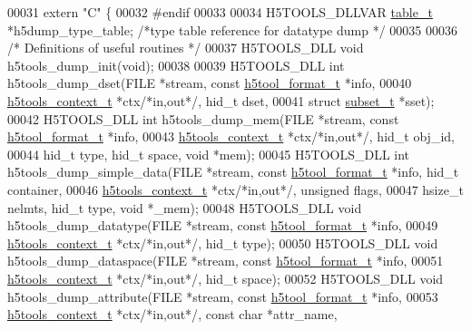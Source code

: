 \begin{DoxyCode}
00031 \textcolor{keyword}{extern} \textcolor{stringliteral}{"C"} \{
00032 \textcolor{preprocessor}{#endif}
00033 
00034 H5TOOLS\_DLLVAR \hyperlink{structtable__t}{table\_t} *h5dump\_type\_table;  \textcolor{comment}{/*type table reference for datatype dump  */}
00035 
00036 \textcolor{comment}{/* Definitions of useful routines */}
00037 H5TOOLS\_DLL \textcolor{keywordtype}{void}    h5tools\_dump\_init(\textcolor{keywordtype}{void});
00038 
00039 H5TOOLS\_DLL \textcolor{keywordtype}{int}     h5tools\_dump\_dset(FILE *stream, \textcolor{keyword}{const} \hyperlink{structh5tool__format__t}{h5tool\_format\_t} *info,
00040                             \hyperlink{structh5tools__context__t}{h5tools\_context\_t} *ctx\textcolor{comment}{/*in,out*/}, hid\_t dset,
00041                             \textcolor{keyword}{struct} \hyperlink{structsubset__t}{subset\_t} *sset);
00042 H5TOOLS\_DLL \textcolor{keywordtype}{int}     h5tools\_dump\_mem(FILE *stream, \textcolor{keyword}{const} \hyperlink{structh5tool__format__t}{h5tool\_format\_t} *info,
00043                             \hyperlink{structh5tools__context__t}{h5tools\_context\_t} *ctx\textcolor{comment}{/*in,out*/}, hid\_t obj\_id,
00044                             hid\_t type, hid\_t space, \textcolor{keywordtype}{void} *mem);
00045 H5TOOLS\_DLL \textcolor{keywordtype}{int}     h5tools\_dump\_simple\_data(FILE *stream, \textcolor{keyword}{const} \hyperlink{structh5tool__format__t}{h5tool\_format\_t} *info, 
      hid\_t container,
00046                             \hyperlink{structh5tools__context__t}{h5tools\_context\_t} *ctx\textcolor{comment}{/*in,out*/}, \textcolor{keywordtype}{unsigned} flags,
00047                             hsize\_t nelmts, hid\_t type, \textcolor{keywordtype}{void} *\_mem);
00048 H5TOOLS\_DLL \textcolor{keywordtype}{void}    h5tools\_dump\_datatype(FILE *stream, \textcolor{keyword}{const} \hyperlink{structh5tool__format__t}{h5tool\_format\_t} *info,
00049                             \hyperlink{structh5tools__context__t}{h5tools\_context\_t} *ctx\textcolor{comment}{/*in,out*/}, hid\_t type);
00050 H5TOOLS\_DLL \textcolor{keywordtype}{void}    h5tools\_dump\_dataspace(FILE *stream, \textcolor{keyword}{const} \hyperlink{structh5tool__format__t}{h5tool\_format\_t} *info,
00051                             \hyperlink{structh5tools__context__t}{h5tools\_context\_t} *ctx\textcolor{comment}{/*in,out*/}, hid\_t space);
00052 H5TOOLS\_DLL \textcolor{keywordtype}{void}    h5tools\_dump\_attribute(FILE *stream, \textcolor{keyword}{const} \hyperlink{structh5tool__format__t}{h5tool\_format\_t} *info,
00053                             \hyperlink{structh5tools__context__t}{h5tools\_context\_t} *ctx\textcolor{comment}{/*in,out*/}, \textcolor{keyword}{const} \textcolor{keywordtype}{char} *attr\_name, 

\end{DoxyCode}
